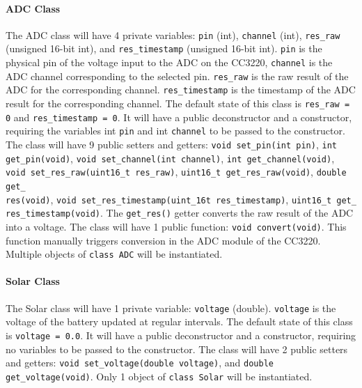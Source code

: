 \paragraph{ADC Class}
The ADC class will have 4 private variables: \texttt{pin} (int), 
\texttt{channel} (int), \texttt{res\_raw} (unsigned 16-bit int), and
\texttt{res\_timestamp} (unsigned 16-bit int). \texttt{pin} is the physical
pin of the voltage input to the ADC on the CC3220, \texttt{channel} is the
ADC channel corresponding to the selected pin. \texttt{res\_raw} is the raw
result of the ADC for the corresponding channel. \texttt{res\_timestamp} is the
timestamp of the ADC result for the corresponding channel. The default state
of this class is \texttt{res\_raw = 0} and \texttt{res\_timestamp = 0}. It will
have a public deconstructor and a constructor, requiring the variables int
\texttt{pin} and int \texttt{channel} to be passed to the constructor.
The class will have 9 public setters and getters:
\texttt{void set\_pin(int pin)}, \texttt{int get\_pin(void)},
\texttt{void set\_channel(int channel)}, \texttt{int get\_channel(void)},
\texttt{void set\_res\_raw(uint16\_t res\_raw)},
\texttt{uint16\_t get\_res\_raw(void)},
\texttt{double get\_\\
res(void)},
\texttt{void set\_res\_timestamp(uint\_16t res\_timestamp)},
\texttt{uint16\_t get\_\\
res\_timestamp(void)}. The \texttt{get\_res()} getter
converts the raw result of the ADC into a voltage. The class will have 1 public
function: \texttt{void convert(void)}. This function manually triggers
conversion in the ADC module of the CC3220. Multiple objects of
\texttt{class ADC} will be instantiated.

\paragraph{Solar Class}
The Solar class will have 1 private variable: \texttt{voltage} (double). \texttt{voltage} is the voltage of the battery updated at
regular intervals. The default state of this class is \texttt{voltage = 0.0}. It will have a public
deconstructor and a constructor, requiring no variables to be passed to the
constructor. The class will have 2 public setters and getters:
\texttt{void set\_voltage(double voltage)}, and
\texttt{double get\_voltage(void)}. Only 
1 object of \texttt{class Solar} will be instantiated.


